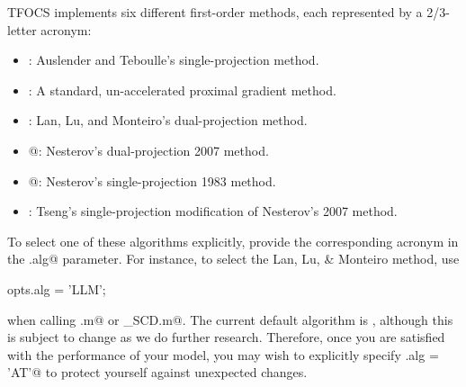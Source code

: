 \documentclass{article}
\begin{document}
TFOCS implements six different first-order methods, 
each represented by a 2/3-letter acronym:
\begin{itemize}
\itemsep 0pt
\item \verb@AT@: Auslender and Teboulle's single-projection method.
\item \verb@GRA@: A standard, un-accelerated proximal gradient method.
\item \verb@LLM@: Lan, Lu, and Monteiro's dual-projection method.
\item {}@: Nesterov's dual-projection 2007 method.
\item {}@: Nesterov's single-projection 1983 method.
\item \verb@TS@: Tseng's single-projection modification of Nesterov's 2007 method.
\end{itemize}
To select one of these algorithms explicitly, provide the corresponding
acronym in the \verb@opts.alg@ parameter. For instance,
to select the Lan, Lu, \& Monteiro method, use
\begin{code}
	opts.alg = 'LLM';
\end{code}
when calling  \verb@tfocs.m@ or \verb@tfocs_SCD.m@. The current default
algorithm is \verb@AT@, although this is subject to change as we do
further research. Therefore, once you are satisfied with the performance
of your model, you may wish to explicitly specify \verb@opts.alg = 'AT'@
to protect yourself against unexpected changes.
\end{document}
